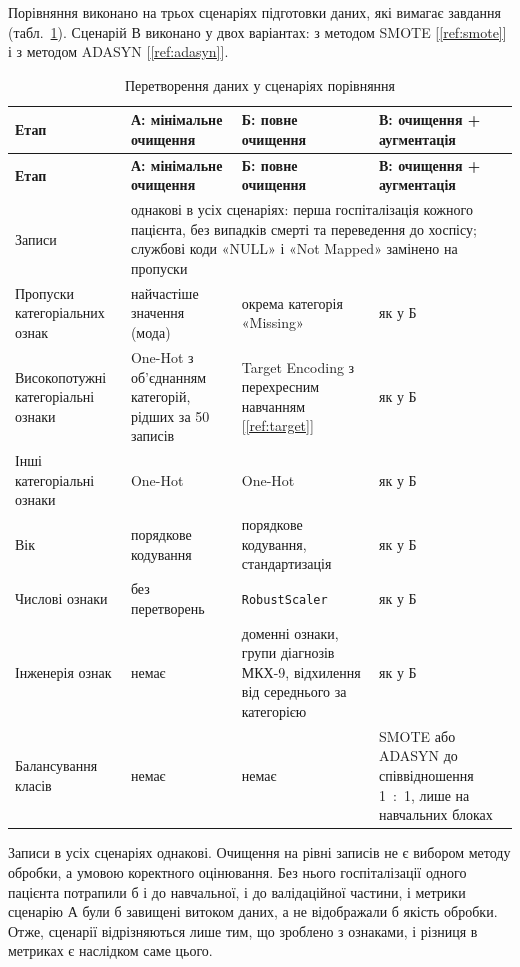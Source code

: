 \documentclass[14pt,a4paper]{extreport}
\begin{document}
Порівняння виконано на трьох сценаріях підготовки даних, які вимагає завдання (табл.~\ref{tab:scenarios}). Сценарій В виконано у двох варіантах: з методом SMOTE [\ref{ref:smote}] і з методом ADASYN [\ref{ref:adasyn}].

{\small
\renewcommand{\arraystretch}{1.15}
\begin{longtable}{|p{3.0cm}|p{4.3cm}|p{4.3cm}|p{3.2cm}|}
\caption{Перетворення даних у сценаріях порівняння}
\label{tab:scenarios} \\
\hline
\textbf{Етап} & \textbf{А: мінімальне очищення} & \textbf{Б: повне очищення} & \textbf{В: очищення + аугментація} \\
\hline
\endfirsthead
\hline
\textbf{Етап} & \textbf{А: мінімальне очищення} & \textbf{Б: повне очищення} & \textbf{В: очищення + аугментація} \\
\hline
\endhead
Записи & \multicolumn{3}{p{12.2cm}|}{однакові в усіх сценаріях: перша госпіталізація кожного пацієнта, без випадків смерті та переведення до хоспісу; службові коди «NULL» і «Not Mapped» замінено на пропуски} \\
\hline
Пропуски категоріальних ознак & найчастіше значення (мода) & окрема категорія «Missing» & як у Б \\
\hline
Високопотужні категоріальні ознаки & One-Hot з об'єднанням категорій, рідших за 50 записів & Target Encoding з перехресним навчанням [\ref{ref:target}] & як у Б \\
\hline
Інші категоріальні ознаки & One-Hot & One-Hot & як у Б \\
\hline
Вік & порядкове кодування & порядкове кодування, стандартизація & як у Б \\
\hline
Числові ознаки & без перетворень & \texttt{RobustScaler} & як у Б \\
\hline
Інженерія ознак & немає & доменні ознаки, групи діагнозів МКХ-9, відхилення від середнього за категорією & як у Б \\
\hline
Балансування класів & немає & немає & SMOTE або ADASYN до співвідношення 1~:~1, лише на навчальних блоках \\
\hline
\end{longtable}
}

Записи в усіх сценаріях однакові. Очищення на рівні записів не є вибором методу обробки, а умовою коректного оцінювання. Без нього госпіталізації одного пацієнта потрапили б і до навчальної, і до валідаційної частини, і метрики сценарію А були б завищені витоком даних, а не відображали б якість обробки. Отже, сценарії відрізняються лише тим, що зроблено з ознаками, і різниця в метриках є наслідком саме цього.
\end{document}
